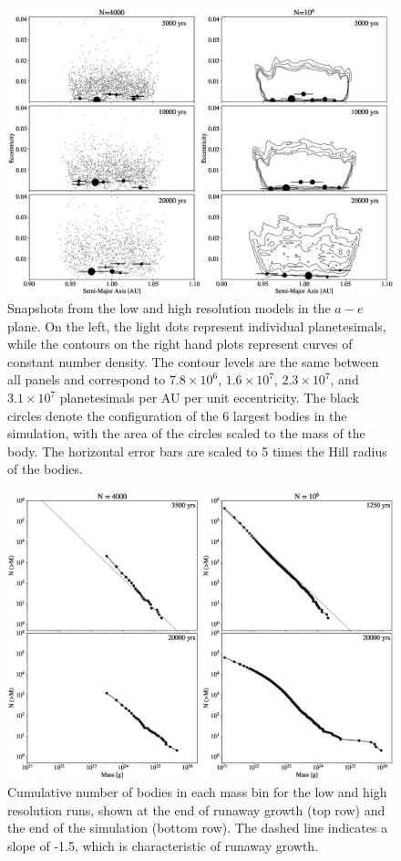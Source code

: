 \begin{figure}
    \includegraphics[width=\textwidth]{figures/plSS/ecc_evo.eps}
    \caption{Snapshots from the low and high resolution models in the $a-e$ plane. On the left, the light dots represent individual planetesimals, while the contours on the right hand plots represent curves of constant number density. The contour levels are the same between all panels and correspond to $7.8 \times 10^6$, $1.6 \times 10^7$, $2.3 \times 10^7$, and $3.1 \times 10^7$ planetesimals per AU per unit eccentricity. The black circles denote the configuration of the 6 largest bodies in the simulation, with the area of the circles scaled to the mass of the body. The horizontal error bars are scaled to 5 times the Hill radius of the bodies.
    \label{fig:ae}}
\end{figure}

\begin{figure}
    \includegraphics[width=\textwidth]{figures/plSS/mass_spectrum_evo.eps}
    \caption{Cumulative number of bodies in each mass bin for the low and high resolution runs, shown at the end of runaway growth (top row) and the end of the simulation (bottom row). The dashed line indicates a slope of -1.5, which is characteristic of runaway growth.
    \label{fig:mass_spectrum_evo}}
\end{figure}

